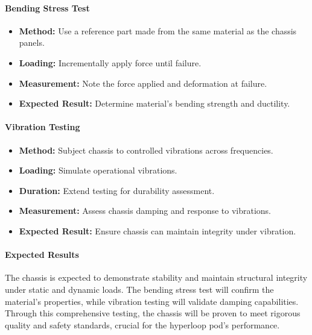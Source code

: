\paragraph{Bending Stress Test}
\begin{itemize}
    \item \textbf{Method:} Use a reference part made from the same material as the chassis panels.
    \item \textbf{Loading:} Incrementally apply force until failure.
    \item \textbf{Measurement:} Note the force applied and deformation at failure.
    \item \textbf{Expected Result:} Determine material's bending strength and ductility.
\end{itemize}

\paragraph{Vibration Testing}
\begin{itemize}
    \item \textbf{Method:} Subject chassis to controlled vibrations across frequencies.
    \item \textbf{Loading:} Simulate operational vibrations.
    \item \textbf{Duration:} Extend testing for durability assessment.
    \item \textbf{Measurement:} Assess chassis damping and response to vibrations.
    \item \textbf{Expected Result:} Ensure chassis can maintain integrity under vibration.
\end{itemize}

\paragraph{Expected Results}
The chassis is expected to demonstrate stability and maintain structural integrity under static and dynamic loads. The bending stress test will confirm the material's properties, while vibration testing will validate damping capabilities. Through this comprehensive testing, the chassis will be proven to meet rigorous quality and safety standards, crucial for the hyperloop pod's performance.
